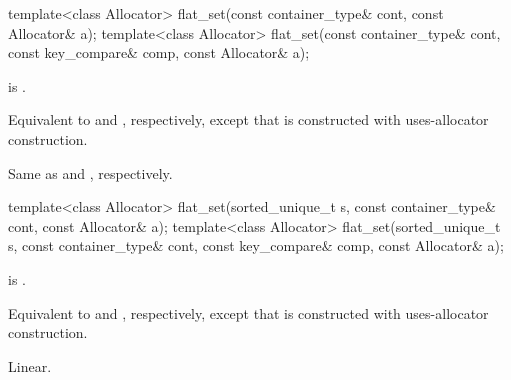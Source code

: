 %
\begin{itemdecl}
template<class Allocator>
  flat_set(const container_type& cont, const Allocator& a);
template<class Allocator>
  flat_set(const container_type& cont, const key_compare& comp, const Allocator& a);
\end{itemdecl}

\begin{itemdescr}
\pnum
\constraints
{} is .

\pnum
\effects
Equivalent to
 and , respectively,
except that  is constructed with
uses-allocator construction.

\pnum
\complexity
Same as  and , respectively.
\end{itemdescr}

%
\begin{itemdecl}
template<class Allocator>
  flat_set(sorted_unique_t s, const container_type& cont, const Allocator& a);
template<class Allocator>
  flat_set(sorted_unique_t s, const container_type& cont,
           const key_compare& comp, const Allocator& a);
\end{itemdecl}

\begin{itemdescr}
\pnum
\constraints
{} is .

\pnum
\effects
Equivalent to
 and , respectively,
except that  is constructed with
uses-allocator construction.

\pnum
\complexity
Linear.
\end{itemdescr}


